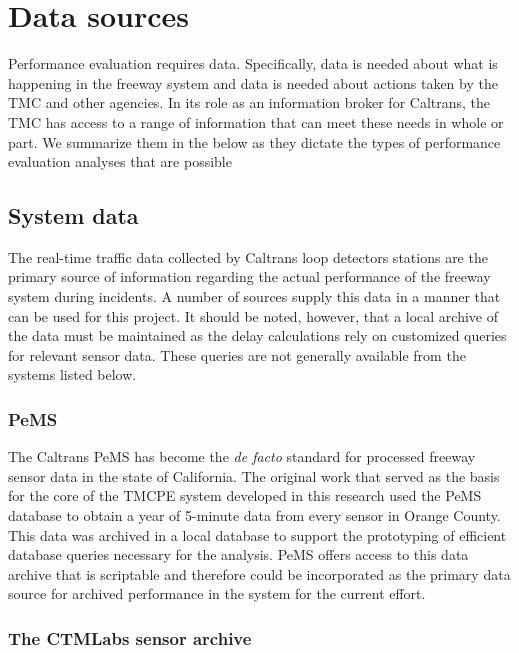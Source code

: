 \documentclass[12pt]{report}
\newcounter{time}
\begin{document}
\section{Data sources}
\label{sec:data-sources}

Performance evaluation requires data.  Specifically, data is needed
about what is happening in the freeway system and data is needed about
actions taken by the \ac{TMC} and other agencies.  In its role as an
information broker for Caltrans, the \ac{TMC} has access to a range of
information that can meet these needs in whole or part.  We summarize
them in the below as they dictate the types of performance evaluation
analyses that are possible

\subsection{System data}
\label{sec:system-data}

The real-time traffic data collected by Caltrans loop detectors
stations are the primary source of information regarding the actual
performance of the freeway system during incidents. A number of
sources supply this data in a manner that can be used for this
project.  It should be noted, however, that a local archive of the
data must be maintained as the delay calculations rely on customized
queries for relevant sensor data.  These queries are not generally
available from the systems listed below.

\subsubsection{PeMS}
\label{sec:pems}

The Caltrans \acl{PeMS} has become the \emph{de facto} standard for
processed freeway sensor data in the state of California.  The
original work that served as the basis for the core of the \ac{TMCPE}
system developed in this research
\citep{recker05:_tool_for_incor_of_non} used the \ac{PeMS} database to
obtain a year of 5-minute data from every sensor in Orange County.
This data was archived in a local database to support the prototyping
of efficient database queries necessary for the analysis.  \ac{PeMS}
offers access to this data archive that is scriptable and therefore
could be incorporated as the primary data source for archived
performance in the system for the current effort.

\subsubsection{The CTMLabs sensor archive}
\label{sec:uci-data}
\end{document}
